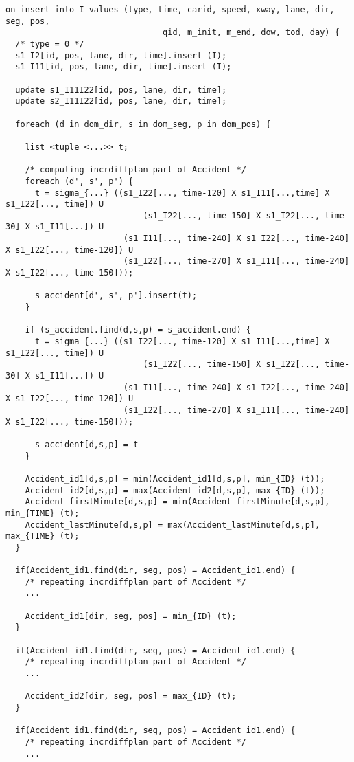 \pagebreak
\begin{verbatim}
on insert into I values (type, time, carid, speed, xway, lane, dir, seg, pos, 
                                qid, m_init, m_end, dow, tod, day) {
  /* type = 0 */
  s1_I2[id, pos, lane, dir, time].insert (I);
  s1_I11[id, pos, lane, dir, time].insert (I);
  
  update s1_I11I22[id, pos, lane, dir, time];
  update s2_I11I22[id, pos, lane, dir, time];
 
  foreach (d in dom_dir, s in dom_seg, p in dom_pos) {
	
    list <tuple <...>> t;

    /* computing incrdiffplan part of Accident */
    foreach (d', s', p') {
      t = sigma_{...} ((s1_I22[..., time-120] X s1_I11[...,time] X s1_I22[..., time]) U
    						(s1_I22[..., time-150] X s1_I22[..., time-30] X s1_I11[...]) U
						(s1_I11[..., time-240] X s1_I22[..., time-240] X s1_I22[..., time-120]) U
						(s1_I22[..., time-270] X s1_I11[..., time-240] X s1_I22[..., time-150]));

      s_accident[d', s', p'].insert(t);
    }
    
    if (s_accident.find(d,s,p) = s_accident.end) {
      t = sigma_{...} ((s1_I22[..., time-120] X s1_I11[...,time] X s1_I22[..., time]) U
    						(s1_I22[..., time-150] X s1_I22[..., time-30] X s1_I11[...]) U
						(s1_I11[..., time-240] X s1_I22[..., time-240] X s1_I22[..., time-120]) U
						(s1_I22[..., time-270] X s1_I11[..., time-240] X s1_I22[..., time-150]));

      s_accident[d,s,p] = t
    }
    
    Accident_id1[d,s,p] = min(Accident_id1[d,s,p], min_{ID} (t));
    Accident_id2[d,s,p] = max(Accident_id2[d,s,p], max_{ID} (t));
    Accident_firstMinute[d,s,p] = min(Accident_firstMinute[d,s,p], min_{TIME} (t);
    Accident_lastMinute[d,s,p] = max(Accident_lastMinute[d,s,p], max_{TIME} (t);
  }
  
  if(Accident_id1.find(dir, seg, pos) = Accident_id1.end) {
    /* repeating incrdiffplan part of Accident */
    ...
    
    Accident_id1[dir, seg, pos] = min_{ID} (t);
  }

  if(Accident_id1.find(dir, seg, pos) = Accident_id1.end) {
    /* repeating incrdiffplan part of Accident */
    ...
    
    Accident_id2[dir, seg, pos] = max_{ID} (t);
  }

  if(Accident_id1.find(dir, seg, pos) = Accident_id1.end) {
    /* repeating incrdiffplan part of Accident */
    ...
    

\end{verbatim}
